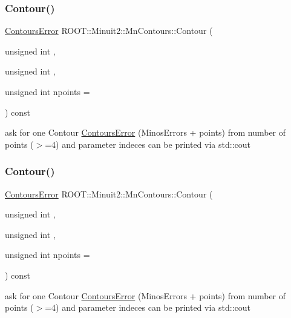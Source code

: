 \mbox{\label{classROOT_1_1Minuit2_1_1MnContours_a8bcd5be6a72acc39c1b56fd45e9958ba}} 
\subsubsection{\texorpdfstring{Contour()}{Contour()}\hspace{0.1cm}{\footnotesize\ttfamily [2/3]}}
{\footnotesize\ttfamily \mbox{\hyperlink{classROOT_1_1Minuit2_1_1ContoursError}{Contours\+Error}} R\+O\+O\+T\+::\+Minuit2\+::\+Mn\+Contours\+::\+Contour (\begin{DoxyParamCaption}\item[{unsigned int}]{,  }\item[{unsigned int}]{,  }\item[{unsigned int}]{npoints = {} }\end{DoxyParamCaption}) const}

ask for one Contour \mbox{\hyperlink{classROOT_1_1Minuit2_1_1ContoursError}{Contours\+Error}} (Minos\+Errors + points) from number of points ($>$=4) and parameter indeces can be printed via std\+::cout \mbox{\label{classROOT_1_1Minuit2_1_1MnContours_a8bcd5be6a72acc39c1b56fd45e9958ba}} 
\subsubsection{\texorpdfstring{Contour()}{Contour()}\hspace{0.1cm}{\footnotesize\ttfamily [3/3]}}
{\footnotesize\ttfamily \mbox{\hyperlink{classROOT_1_1Minuit2_1_1ContoursError}{Contours\+Error}} R\+O\+O\+T\+::\+Minuit2\+::\+Mn\+Contours\+::\+Contour (\begin{DoxyParamCaption}\item[{unsigned int}]{,  }\item[{unsigned int}]{,  }\item[{unsigned int}]{npoints = {} }\end{DoxyParamCaption}) const}

ask for one Contour \mbox{\hyperlink{classROOT_1_1Minuit2_1_1ContoursError}{Contours\+Error}} (Minos\+Errors + points) from number of points ($>$=4) and parameter indeces can be printed via std\+::cout \mbox{\label{classROOT_1_1Minuit2_1_1MnContours_a8d3577d628e22ad0513ed1eb71f8619b}} 
